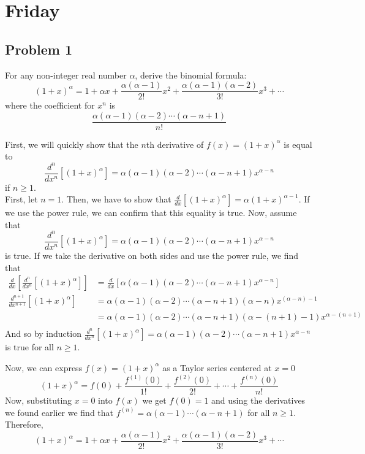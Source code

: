\documentclass{ben}
\begin{document}
\section{Friday}
\subsection{Problem 1}
\noindent
For any non-integer real number $\alpha$, derive the binomial formula:
\[
(1 + x)^\alpha = 1 + \alpha x + \frac{\alpha(\alpha - 1)}{2!} x^2
+ \frac{\alpha (\alpha - 1)(\alpha - 2)}{3!}x^3 + \cdots
\]
where the coefficient for $x^n$ is
\[
\frac{\alpha (\alpha - 1) (\alpha - 2) \cdots (\alpha - n + 1)}{n!}
\]
\begin{solution}
    First, we will quickly show that the $n$th derivative of $f(x) = (1 + x)^\alpha$ is equal to
    \[
    \frac{d^n}{dx^n}\left[ (1 + x)^\alpha \right] = \alpha (\alpha - 1) (\alpha - 2) \cdots (\alpha - n + 1) x^{\alpha - n}
    \]
    if $n \geq 1$.\\
    First, let $n = 1$. Then, we have to show that
    $\frac{d}{dx} \left[ (1 + x)^\alpha \right] = \alpha (1 + x)^{\alpha - 1}$.
    If we use the power rule, we can confirm that this equality is true.
    Now, assume that
    \[
    \frac{d^n}{dx^n} \left[ (1 + x)^\alpha \right] = \alpha (\alpha - 1) (\alpha - 2) \cdots (\alpha - n + 1) x^{\alpha - n}
    \]
    is true.
    If we take the derivative on both sides and use the power rule, we find that
    \begin{align*}
        \frac{d}{dx} \left[ \frac{d^n}{dx^n} \left[ (1 + x)^\alpha \right] \right]
        &= \frac{d}{dx} \left[ \alpha (\alpha - 1) (\alpha - 2) \cdots (\alpha - n + 1) x^{\alpha - n} \right]\\
        \frac{d^{n+1}}{dx^{n+1}} \left[ (1 + x)^\alpha \right]
        &= \alpha (\alpha - 1) (\alpha - 2) \cdots (\alpha - n + 1)(\alpha - n)x^{(\alpha - n) - 1}\\
        &= \alpha (\alpha - 1) (\alpha - 2) \cdots (\alpha - n + 1)(\alpha - (n + 1) - 1) x^{\alpha - (n + 1)}\\ 
    \end{align*}
    And so by induction
    $\frac{d^n}{dx^n} \left[ (1 + x)^\alpha \right] = \alpha (\alpha - 1) (\alpha - 2) \cdots (\alpha - n + 1) x^{\alpha - n}$
    is true for all $n \geq 1$.
    
    Now, we can express $f(x) = (1 + x)^\alpha$ as a Taylor series centered at $x = 0$
    \[
    (1 + x)^\alpha = f(0) + \frac{f^{(1)}(0)}{1!} + \frac{f^{(2)}(0)}{2!} + \cdots
    + \frac{f^{(n)}(0)}{n!}
    \]
    Now, substituting $x = 0$ into $f(x)$ we get $f(0) = 1$ and using the derivatives we found
    earlier we find that $f^{(n)} = \alpha (\alpha - 1) \cdots (\alpha - n + 1)$ for all $n \geq 1$.
    Therefore,
    \[
    (1 + x)^\alpha = 1 + \alpha x + \frac{\alpha(\alpha - 1)}{2!} x^2
    + \frac{\alpha (\alpha - 1)(\alpha - 2)}{3!}x^3 + \cdots
    \]
\end{solution}
\end{document}
